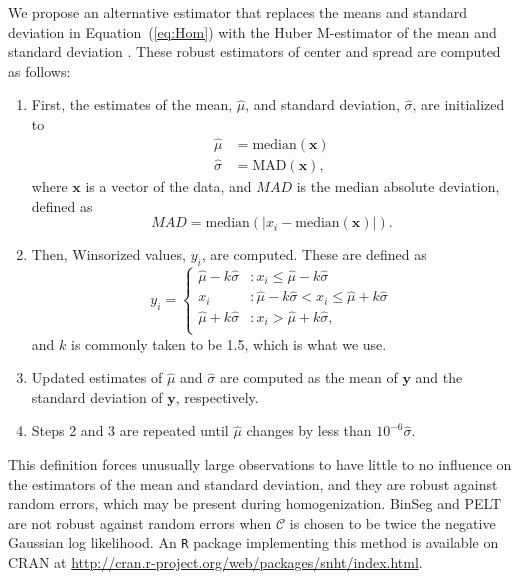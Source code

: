 \documentclass[12pt]{article}
\def\ni{\noindent}
\begin{document}
\begin{doublespacing}
We propose an alternative estimator that replaces the means and standard deviation in Equation~(\ref{eq:Hom}) with the Huber M-estimator of the mean and standard deviation \cite{huber11}.  These robust estimators of center and spread are computed as follows:
\begin{enumerate}
	\item First, the estimates of the mean, $\hat{\mu}$, and standard deviation, $\hat{\sigma}$, are initialized to
	\begin{align*}
		\hat{\mu} &= \mbox{median}(\mathbf{x})\\
		\hat{\sigma} &= \mbox{MAD}(\mathbf{x}),
	\end{align*}
	where $\mathbf{x}$ is a vector of the data, and $MAD$ is the median absolute deviation, defined as
	\begin{equation*}
		MAD = \mbox{median}( \lvert x_i - \mbox{median}(\mathbf{x}) \rvert ).
	\end{equation*}
	\item Then, Winsorized values, $y_i$, are computed.  These are defined as
	\begin{equation*}
		y_i = \left\{ \begin{array}{ll}
			\hat{\mu}-k \hat{\sigma} & : x_i \leq \hat{\mu}-k \hat{\sigma}\\
			x_i & : \hat{\mu}-k \hat{\sigma} < x_i \leq \hat{\mu}+k \hat{\sigma}\\
			\hat{\mu}+k \hat{\sigma} & : x_i > \hat{\mu}+k \hat{\sigma},\\
		\end{array} \right.
	\end{equation*}
	and $k$ is commonly taken to be 1.5, which is what we use.
	\item Updated estimates of $\hat{\mu}$ and $\hat{\sigma}$ are computed as the mean of $\mathbf{y}$ and the standard deviation of $\mathbf{y}$, respectively.
	\item Steps 2 and 3 are repeated until $\hat{\mu}$ changes by less than $10^{-6} \hat{\sigma}$.
\end{enumerate}

\ni This definition forces unusually large observations to have little to no influence on the estimators of the mean and standard deviation, and they are robust against random errors, which may be present during homogenization.  BinSeg and PELT are not robust against random errors when $\mathcal{C}$ is chosen to be twice the negative Gaussian log likelihood.  An \texttt{R} package implementing this method is available on CRAN at \url{http://cran.r-project.org/web/packages/snht/index.html}.



\end{doublespacing}
\end{document}
